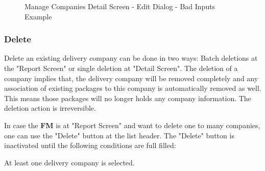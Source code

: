\begin{figure}[H]
	\centering
    \vspace{5pt}
    \hspace{5pt}
    \caption{Manage Companies Detail Screen - Edit Dialog - Bad Inputs Example}
	\label{fig:MCDetailEditDlgBad}
\end{figure}

\subsubsection{Delete}

Delete an existing delivery company can be done in two ways: Batch deletions at the "Report Screen" or single deletion at "Detail Screen". The deletion of a company implies that, the delivery company will be removed completely and any association of existing packages to this company is automatically removed as well. This means those packages will no longer holds any company information. The deletion action is irreversible. 

In case the \textbf{FM} is at "Report Screen" and want to delete one to many companies, one can use the "Delete" button at the list header. The "Delete" button is inactivated until the following conditions are full filled:

\begin{compactenum}
    \item At least one delivery company is selected.
\end{compactenum}

